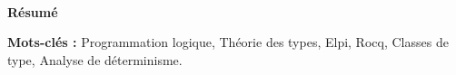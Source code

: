 \documentclass{these-ISSS}
\begin{document}
  
  

  \backmatter

  \renewcommand{\bibtitle}{\bibchapter}
  





  \appendix
  

  \cleardoublepage
  \thispagestyle{empty}\mbox{ }\clearpage
  \pagestyle{empty}
  
  \begin{center}\Large\bf \titreC \end{center}
  \begin{center} {\large\bfseries Résumé}\par\vspace{.1cm} \end{center}
  \resumeC
  \noindent\textbf{Mots-clés :} Programmation logique, Théorie des types, Elpi, Rocq, Classes de type, Analyse de déterminisme.
\end{document}
